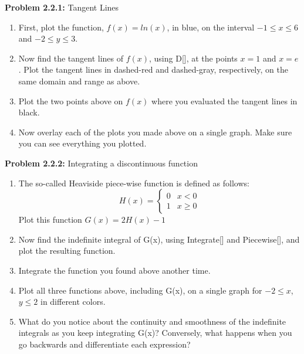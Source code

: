 \documentclass{article}
\date{} %
\begin{document}
    \pagestyle{fancy}
    \headheight=10pt
    \fancyfoot[C]{\thepage}
    
   
    \textbf{Problem 2.2.1:} Tangent Lines 
    \begin{enumerate}[label=\textbf{\alph*)}]
    \item First, plot the function, $f(x) = ln(x)$, in blue, on the interval $-1 \leq x \leq 6$ and $-2 \leq y \leq 3$. \\
    \item Now find the tangent lines of $f(x)$, using D[], at the points $x = 1$ and $x = e$. Plot the tangent lines in dashed-red and dashed-gray, respectively, on the same domain and range as above.
    \item Plot the two points above on $f(x)$ where you evaluated the tangent lines in black.
    \item Now overlay each of the plots you made above on a single graph. Make sure you can see everything you plotted.
    \end{enumerate}

    \textbf{Problem 2.2.2:} Integrating a discontinuous function 
    \begin{enumerate}[label=\textbf{\alph*)}]
        \item The so-called Heaviside piece-wise function is defined as follows:
        \begin{equation*}
            H(x) = \begin{cases}
                0 & x < 0 \\
                1 & x \geq 0
            \end{cases}
        \end{equation*}
        Plot this function $G(x)= 2H(x)-1$
        \item Now find the indefinite integral of G(x), using Integrate[] and Piecewise[], and plot the resulting function.
        \item Integrate the function you found above another time.
        \item Plot all three functions above, including G(x), on a single graph for $-2 \leq x$, $y \leq 2$ in different colors.
        \item What do you notice about the continuity and smoothness of the indefinite integrals as you keep integrating G(x)? Conversely, what happens when you go backwards and differentiate each expression?
    \end{enumerate}
    
\end{document}

